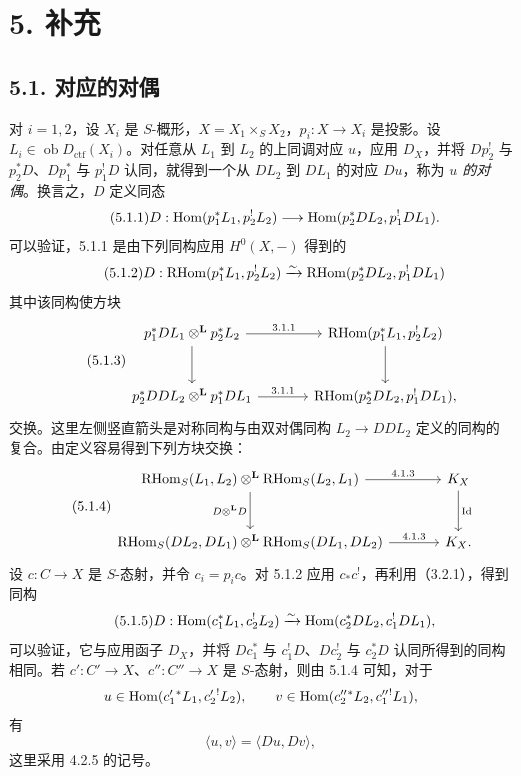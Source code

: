 \section*{5. 补充}

\subsection*{5.1. 对应的对偶}

对 $i=1,2$，设 $X_i$ 是 $S$-概形，$X=X_1\times_S X_2$，$p_i:X\to X_i$ 是投影。设 $L_i\in\operatorname{ob}D_{\mathrm{ctf}}(X_i)$。对任意从 $L_1$ 到 $L_2$ 的上同调对应 $u$，应用 $D_X$，并将 $Dp_2^!$ 与 $p_2^*D$、$Dp_1^*$ 与 $p_1^!D$ 认同，就得到一个从 $DL_2$ 到 $DL_1$ 的对应 $Du$，称为 \emph{$u$ 的对偶}。换言之，$D$ 定义同态
\begin{equation}
\tag{5.1.1}
D:\operatorname{Hom}(p_1^*L_1,p_2^!L_2)\longrightarrow \operatorname{Hom}(p_2^*DL_2,p_1^!DL_1).
\end{equation}
可以验证，5.1.1 是由下列同构应用 $H^0(X,-)$ 得到的
\begin{equation}
\tag{5.1.2}
D:\mathrm{RHom}(p_1^*L_1,p_2^!L_2)\xrightarrow{\sim}\mathrm{RHom}(p_2^*DL_2,p_1^!DL_1)
\end{equation}
其中该同构使方块
\begin{equation}
\tag{5.1.3}
\begin{tikzcd}[column sep=large,row sep=large]
p_1^*DL_1\otimes^{\mathbf L}p_2^*L_2 \arrow[r,"3.1.1"] \arrow[d]
& \RHom(p_1^*L_1,p_2^!L_2) \arrow[d] \\
p_2^*DDL_2\otimes^{\mathbf L}p_1^*DL_1 \arrow[r,"3.1.1"]
& \RHom(p_2^*DL_2,p_1^!DL_1),
\end{tikzcd}
\end{equation}
交换。这里左侧竖直箭头是对称同构与由双对偶同构 $L_2\to DDL_2$ 定义的同构的复合。由定义容易得到下列方块交换：
\begin{equation}
\tag{5.1.4}
\begin{tikzcd}[column sep=large,row sep=large]
\RHom_S(L_1,L_2)\otimes^{\mathbf L}\RHom_S(L_2,L_1) \arrow[r,"4.1.3"] \arrow[d,"D\otimes^{\mathbf L} D"']
& K_X \arrow[d,"\operatorname{Id}"] \\
\RHom_S(DL_2,DL_1)\otimes^{\mathbf L}\RHom_S(DL_1,DL_2) \arrow[r,"4.1.3"]
& K_X.
\end{tikzcd}
\end{equation}
设 $c:C\to X$ 是 $S$-态射，并令 $c_i=p_ic$。对 5.1.2 应用 $c_*c^!$，再利用（3.2.1），得到同构
\begin{equation}
\tag{5.1.5}
D:\operatorname{Hom}(c_1^*L_1,c_2^!L_2)\xrightarrow{\sim}\operatorname{Hom}(c_2^*DL_2,c_1^!DL_1),
\end{equation}
可以验证，它与应用函子 $D_X$，并将 $Dc_1^*$ 与 $c_1^!D$、$Dc_2^!$ 与 $c_2^*D$ 认同所得到的同构相同。若 $c':C'\to X$、$c'':C''\to X$ 是 $S$-态射，则由 5.1.4 可知，对于
\[
u\in\operatorname{Hom}(c_1'{}^*L_1,c_2'{}^!L_2),\qquad v\in\operatorname{Hom}(c_2''{}^*L_2,c_1''{}^!L_1),\]
有
\begin{equation}
\tag{5.1.6}
\langle u,v\rangle=\langle Du,Dv\rangle,
\end{equation}
这里采用 4.2.5 的记号。

